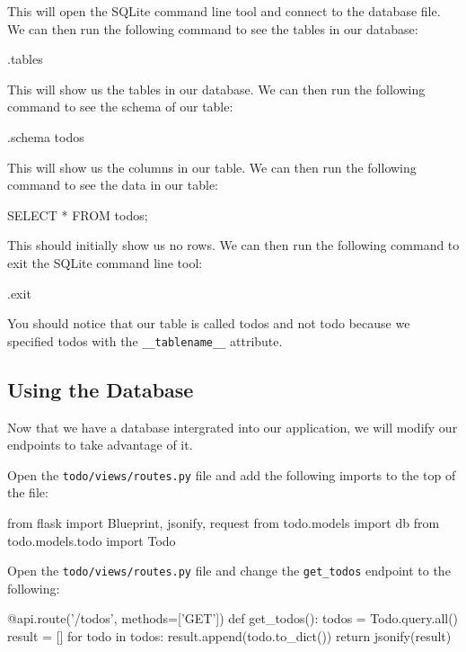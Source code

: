\documentclass{csse4400}
\begin{document}
This will open the SQLite command line tool and connect to the database file.
We can then run the following command to see the tables in our database:

\begin{code}[language=sql,numbers=none]{}
  .tables
\end{code}

This will show us the tables in our database.
We can then run the following command to see the schema of our table:

\begin{code}[language=sql,numbers=none]{}
  .schema todos
\end{code}

This will show us the columns in our table.
We can then run the following command to see the data in our table:

\begin{code}[language=sql,numbers=none]{}
  SELECT * FROM todos;
\end{code}

This should initially show us no rows.
We can then run the following command to exit the SQLite command line tool:

\begin{code}[language=sql,numbers=none]{}
  .exit
\end{code}

You should notice that our table is called todos and not todo because we specified todos with the \texttt{\_\_tablename\_\_} attribute.


\subsection{Using the Database}

Now that we have a database intergrated into our application,
we will modify our endpoints to take advantage of it. 

Open the \texttt{todo/views/routes.py} file and add the following imports to the top of the file:

\begin{code}[language=python,numbers=none]{}
  from flask import Blueprint, jsonify, request
  from todo.models import db
  from todo.models.todo import Todo
\end{code}

Open the \texttt{todo/views/routes.py} file and change the \texttt{get\_todos} endpoint to the following:

\begin{code}[language=python,numbers=none]{}
  @api.route('/todos', methods=['GET'])
  def get_todos():
      todos = Todo.query.all()
      result = []
      for todo in todos:
          result.append(todo.to_dict())
      return jsonify(result)
\end{code}
\end{document}

